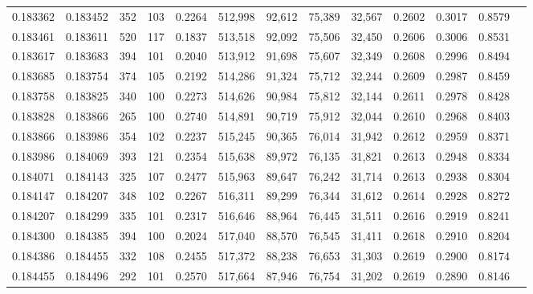 \begin{tabular}{rrrrrrrrrrrrr}
0.183362 & 0.183452 &   352 & 103 &                                     0.2264 & 512,998 &  92,612 &  75,389 &  32,567 & 0.2602 & 0.3017 & 0.8579 \\
0.183461 & 0.183611 &   520 & 117 &                                     0.1837 & 513,518 &  92,092 &  75,506 &  32,450 & 0.2606 & 0.3006 & 0.8531 \\
0.183617 & 0.183683 &   394 & 101 &                                     0.2040 & 513,912 &  91,698 &  75,607 &  32,349 & 0.2608 & 0.2996 & 0.8494 \\
0.183685 & 0.183754 &   374 & 105 &                                     0.2192 & 514,286 &  91,324 &  75,712 &  32,244 & 0.2609 & 0.2987 & 0.8459 \\
0.183758 & 0.183825 &   340 & 100 &                                     0.2273 & 514,626 &  90,984 &  75,812 &  32,144 & 0.2611 & 0.2978 & 0.8428 \\
0.183828 & 0.183866 &   265 & 100 &                                     0.2740 & 514,891 &  90,719 &  75,912 &  32,044 & 0.2610 & 0.2968 & 0.8403 \\
0.183866 & 0.183986 &   354 & 102 &                                     0.2237 & 515,245 &  90,365 &  76,014 &  31,942 & 0.2612 & 0.2959 & 0.8371 \\
0.183986 & 0.184069 &   393 & 121 &                                     0.2354 & 515,638 &  89,972 &  76,135 &  31,821 & 0.2613 & 0.2948 & 0.8334 \\
0.184071 & 0.184143 &   325 & 107 &                                     0.2477 & 515,963 &  89,647 &  76,242 &  31,714 & 0.2613 & 0.2938 & 0.8304 \\
0.184147 & 0.184207 &   348 & 102 &                                     0.2267 & 516,311 &  89,299 &  76,344 &  31,612 & 0.2614 & 0.2928 & 0.8272 \\
0.184207 & 0.184299 &   335 & 101 &                                     0.2317 & 516,646 &  88,964 &  76,445 &  31,511 & 0.2616 & 0.2919 & 0.8241 \\
0.184300 & 0.184385 &   394 & 100 &                                     0.2024 & 517,040 &  88,570 &  76,545 &  31,411 & 0.2618 & 0.2910 & 0.8204 \\
0.184386 & 0.184455 &   332 & 108 &                                     0.2455 & 517,372 &  88,238 &  76,653 &  31,303 & 0.2619 & 0.2900 & 0.8174 \\
0.184455 & 0.184496 &   292 & 101 &                                     0.2570 & 517,664 &  87,946 &  76,754 &  31,202 & 0.2619 & 0.2890 & 0.8146 \\

\end{tabular}
